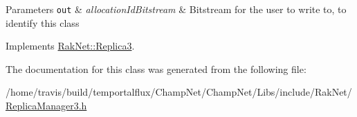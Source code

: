 \begin{DoxyParams}[1]{Parameters}
\mbox{\tt out}  & {\em allocation\-Id\-Bitstream} & Bitstream for the user to write to, to identify this class \\
\hline
\end{DoxyParams}


Implements \hyperlink{class_rak_net_1_1_replica3_ada0458bb521a455f23e08742c9e1b0b9}{Rak\-Net\-::\-Replica3}.



The documentation for this class was generated from the following file\-:\begin{DoxyCompactItemize}
\item 
/home/travis/build/temportalflux/\-Champ\-Net/\-Champ\-Net/\-Libs/include/\-Rak\-Net/\hyperlink{_replica_manager3_8h}{Replica\-Manager3.\-h}\end{DoxyCompactItemize}
